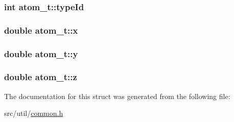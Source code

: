 \subsubsection[{type\+Id}]{\setlength{\rightskip}{0pt plus 5cm}int atom\+\_\+t\+::type\+Id}\label{structatom__t_ac5653f17c6bcb3203b1c1911cd88c4bf}
\hypertarget{structatom__t_a6e538461d4eb4f74334e8bb9bce8dd3b}{}
\subsubsection[{x}]{\setlength{\rightskip}{0pt plus 5cm}double atom\+\_\+t\+::x}\label{structatom__t_a6e538461d4eb4f74334e8bb9bce8dd3b}
\hypertarget{structatom__t_ad4c2c5483ce89ba93612319024416799}{}
\subsubsection[{y}]{\setlength{\rightskip}{0pt plus 5cm}double atom\+\_\+t\+::y}\label{structatom__t_ad4c2c5483ce89ba93612319024416799}
\hypertarget{structatom__t_ab5db012f5e76e4e211b6cdb714cd4f2c}{}
\subsubsection[{z}]{\setlength{\rightskip}{0pt plus 5cm}double atom\+\_\+t\+::z}\label{structatom__t_ab5db012f5e76e4e211b6cdb714cd4f2c}


The documentation for this struct was generated from the following file\+:\begin{DoxyCompactItemize}
\item 
src/util/\hyperlink{common_8h}{common.\+h}\end{DoxyCompactItemize}
